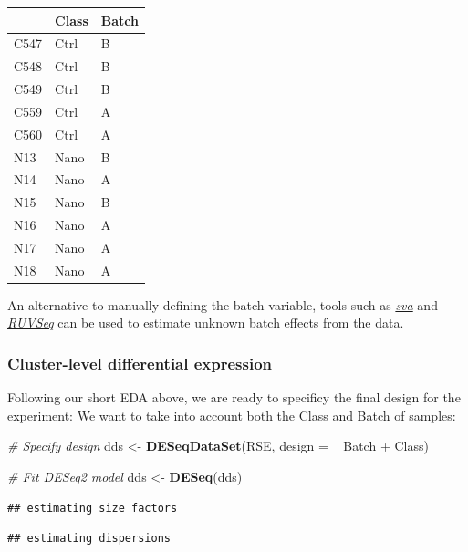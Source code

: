 \documentclass[9pt,a4paper,]{extarticle}
\newenvironment{Shaded}{\begin{snugshade}}{\end{snugshade}}
\newcommand{\KeywordTok}[1]{\textcolor[rgb]{0.13,0.29,0.53}{\textbf{{#1}}}}
\newcommand{\DataTypeTok}[1]{\textcolor[rgb]{0.13,0.29,0.53}{{#1}}}
\newcommand{\StringTok}[1]{\textcolor[rgb]{0.31,0.60,0.02}{{#1}}}
\newcommand{\CommentTok}[1]{\textcolor[rgb]{0.56,0.35,0.01}{\textit{{#1}}}}
\newcommand{\NormalTok}[1]{{#1}}
\begin{document}
\begin{tabular}{l|l|l}
\hline
  & Class & Batch\\
\hline
C547 & Ctrl & B\\
\hline
C548 & Ctrl & B\\
\hline
C549 & Ctrl & B\\
\hline
C559 & Ctrl & A\\
\hline
C560 & Ctrl & A\\
\hline
N13 & Nano & B\\
\hline
N14 & Nano & A\\
\hline
N15 & Nano & B\\
\hline
N16 & Nano & A\\
\hline
N17 & Nano & A\\
\hline
N18 & Nano & A\\
\hline
\end{tabular}

An alternative to manually defining the batch variable, tools such as \emph{\href{https://bioconductor.org/packages/3.8/sva}{sva}} and \emph{\href{https://bioconductor.org/packages/3.8/RUVSeq}{RUVSeq}} can be used to estimate unknown batch effects from the data.

\subsubsection{Cluster-level differential expression}\label{cluster-level-differential-expression}

Following our short EDA above, we are ready to specificy the final design for the experiment: We want to take into account both the Class and Batch of samples:

\begin{Shaded}
\begin{Highlighting}[]
\CommentTok{# Specify design}
\NormalTok{dds <-}\StringTok{ }\KeywordTok{DESeqDataSet}\NormalTok{(RSE, }\DataTypeTok{design =} \NormalTok{~}\StringTok{ }\NormalTok{Batch +}\StringTok{ }\NormalTok{Class)}

\CommentTok{# Fit DESeq2 model}
\NormalTok{dds <-}\StringTok{ }\KeywordTok{DESeq}\NormalTok{(dds)}
\end{Highlighting}
\end{Shaded}

\begin{verbatim}
## estimating size factors
\end{verbatim}

\begin{verbatim}
## estimating dispersions
\end{verbatim}
\end{document}
